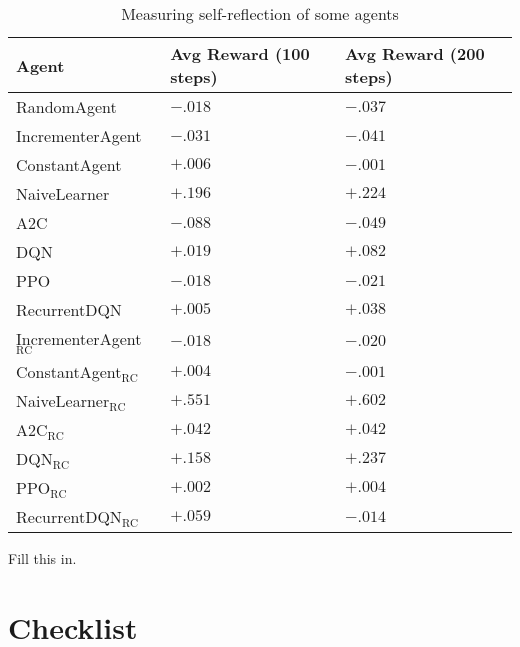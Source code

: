\documentclass{article}
\def\RC{\textrm{RC}}
\begin{document}
\begin{table}
\label{measurementtable}
  \caption{Measuring self-reflection of some agents}
  \centering
  \begin{tabular}{lll}
    \toprule
    Agent     & Avg Reward (100 steps)     & Avg Reward (200 steps)\\
    \midrule
    RandomAgent & $-.018$ & $-.037$\\
    IncrementerAgent & $-.031$ & $-.041$\\
    ConstantAgent & $+.006$ & $-.001$\\
    NaiveLearner & $+.196$ & $+.224$\\
    A2C & $-.088$ & $-.049$\\
    DQN & $+.019$ & $+.082$\\
    PPO & $-.018$ & $-.021$\\
    RecurrentDQN & $+.005$ & $+.038$\\
    IncrementerAgent${}_{\RC}$ & $-.018$ & $-.020$\\
    ConstantAgent${}_{\RC}$ & $+.004$ & $-.001$\\
    NaiveLearner${}_{\RC}$ & $+.551$ & $+.602$\\
    A2C${}_{\RC}$ & $+.042$ & $+.042$\\
    DQN${}_{\RC}$ & $+.158$ & $+.237$\\
    PPO${}_{\RC}$ & $+.002$ & $+.004$\\
    RecurrentDQN${}_{\RC}$ & $+.059$ & $-.014$\\
    \bottomrule
  \end{tabular}
\end{table}


\begin{ack}
Fill this in.
\end{ack}





\section*{Checklist}
\end{document}
